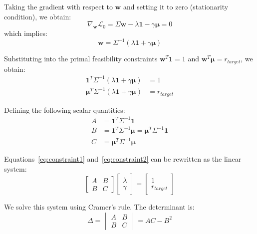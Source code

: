\documentclass[11pt,a4paper]{article}
\begin{document}
Taking the gradient with respect to $\mathbf{w}$ and setting it to zero (stationarity condition), we obtain:
\begin{equation}
\nabla_{\mathbf{w}} \mathcal{L}_0 = \Sigma \mathbf{w} - \lambda \mathbf{1} - \gamma \bm{\mu} = 0
\end{equation}
which implies:
\begin{equation}
\mathbf{w} = \Sigma^{-1}(\lambda \mathbf{1} + \gamma \bm{\mu}) \label{eq:weight_unconstrained}
\end{equation}

Substituting into the primal feasibility constraints $\mathbf{w}^T \mathbf{1} = 1$ and $\mathbf{w}^T \bm{\mu} = r_{target}$, we obtain:
\begin{align}
\mathbf{1}^T \Sigma^{-1} (\lambda \mathbf{1} + \gamma \bm{\mu}) &= 1 \label{eq:constraint1} \\
\bm{\mu}^T \Sigma^{-1} (\lambda \mathbf{1} + \gamma \bm{\mu}) &= r_{target} \label{eq:constraint2}
\end{align}

Defining the following scalar quantities:
\begin{align}
A &= \mathbf{1}^T \Sigma^{-1} \mathbf{1} \\
B &= \mathbf{1}^T \Sigma^{-1} \bm{\mu} = \bm{\mu}^T \Sigma^{-1} \mathbf{1} \\
C &= \bm{\mu}^T \Sigma^{-1} \bm{\mu}
\end{align}

Equations~\eqref{eq:constraint1} and~\eqref{eq:constraint2} can be rewritten as the linear system:
\begin{equation}
\begin{bmatrix}
A & B \\
B & C
\end{bmatrix}
\begin{bmatrix}
\lambda \\
\gamma
\end{bmatrix}
=
\begin{bmatrix}
1 \\
r_{target}
\end{bmatrix}
\end{equation}

We solve this system using Cramer's rule. The determinant is:
\begin{equation}
\Delta = \begin{vmatrix}
A & B \\
B & C
\end{vmatrix} = AC - B^2
\end{equation}
\end{document}
